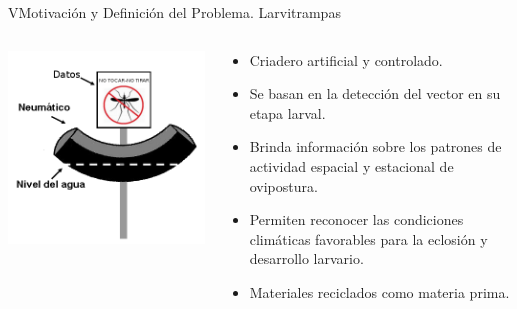 \begin{frame}[t]{VMotivación y Definición del Problema. Larvitrampas}
\begin{center}
\begin{columns}[c]
\begin{column}[c]{3cm}
          \includegraphics[width=\textwidth]{../book/anexos/graphics/disenho-2.png}
        \end{column}
        \begin{column}[c]{7cm}
          \begin{itemize}
            \item Criadero artificial y controlado.
            \item Se basan en la detección del vector en su etapa larval.
            \item Brinda información sobre los patrones de actividad espacial y estacional de ovipostura.
            \item Permiten reconocer las condiciones climáticas favorables para la eclosión y desarrollo larvario.
            \item Materiales reciclados como materia prima.
          \end{itemize}
        \end{column}
      \end{columns}
  \end{center}
\end{frame}


